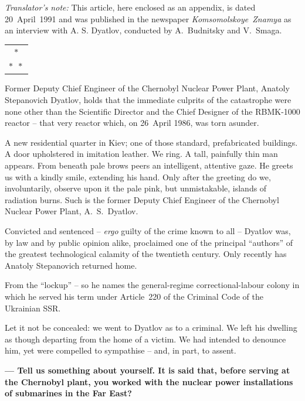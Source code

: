 \documentclass[openright]{bookest}
\newcommand{\varthreestars}{\begin{center}\begin{tabular}{c}$\ast$\\[-0.8ex] $\ast\enspace \ast $\end{tabular}\end{center}}
\begin{document}
\textit{Translator's note:} This article, here enclosed as an appendix, is dated 20~April~1991 and was published in the newspaper \textit{Komsomolskoye~Znamya} as an interview with A. S. Dyatlov, conducted by A.~Budnitsky and V.~Smaga. 

\varthreestars

Former Deputy Chief Engineer of the Chernobyl Nuclear Power Plant, Anatoly Stepanovich Dyatlov, holds that the immediate culprits of the catastrophe were none other than the Scientific Director and the Chief Designer of the RBMK-1000 reactor -- that very reactor which, on 26~April 1986, was torn asunder.

A new residential quarter in Kiev; one of those standard, prefabricated buildings. A door upholstered in imitation leather. We ring. A tall, painfully thin man appears. From beneath pale brows peers an intelligent, attentive gaze. He greets us with a kindly smile, extending his hand. Only after the greeting do we, involuntarily, observe upon it the pale pink, but unmistakable, islands of radiation burns. Such is the former Deputy Chief Engineer of the Chernobyl Nuclear Power Plant, A.~S.~Dyatlov.

Convicted and sentenced -- \textit{ergo} guilty of the crime known to all -- Dyatlov was, by law and by public opinion alike, proclaimed one of the principal ``authors'' of the greatest technological calamity of the twentieth century. Only recently has Anatoly Stepanovich returned home.

From the ``lockup'' -- so he names the general-regime correctional-labour colony in which he served his term under Article~220 of the Criminal Code of the Ukrainian SSR.

Let it not be concealed: we went to Dyatlov as to a criminal. We left his dwelling as though departing from the home of a victim. We had intended to denounce him, yet were compelled to sympathise -- and, in part, to assent.

\medskip

\textbf{--- Tell us something about yourself. It is said that, before serving at the Chernobyl plant, you worked with the nuclear power installations of submarines in the Far East?}
\end{document}
